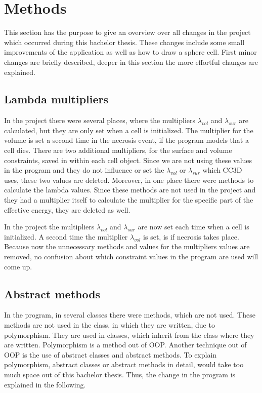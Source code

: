 \chapter{Methods}
    
This section has the purpose to give an overview over all changes in the project which occurred during this bachelor thesis. These changes include some small improvements of the application as well as how to draw a sphere cell. First minor changes are briefly described, deeper in this section the more effortful changes are explained. 

\section{Lambda multipliers} \label{sec:LambdaMultipliers}
In the project there were several places, where the multipliers $\lambda_{vol}$ and $\lambda_{sur}$ are calculated, but they are only set when a cell is initialized. The multiplier for the volume is set a second time in the necrosis event, if the program models that a cell dies. \newline
There are two additional multipliers, for the surface and volume constraints, saved in within each cell object. Since we are not using these values in the program and they do not influence or set the $\lambda_{vol}$ or $\lambda_{sur}$ which \ac{CC3D} uses, these two values are deleted. Moreover, in one place there were methods to calculate the lambda values. Since these methods are not used in the project and they had a multiplier itself to calculate the multiplier for the specific part of the effective energy, they are deleted as well. 

In the project the multipliers $\lambda_{vol}$ and $\lambda_{sur}$ are now set each time when a cell is initialized. A second time the multiplier $\lambda_{vol}$ is set, is if necrosis takes place. Because now the unnecessary methods and values for the multipliers values are removed, no confusion about which constraint values in the program are used will come up.

\section{Abstract methods}\label{sec:AbstractMethods}
In the program, in several classes there were methods, which are not used. These methods are not used in the class, in which they are written, due to polymorphism. They are used in classes, which inherit from the class where they are written. Polymorphism is a method out of \ac{OOP}. Another technique out of \ac{OOP} is the use of abstract classes and abstract methods. To explain polymorphism, abstract classes or abstract methods in detail, would take too much space out of this bachelor thesis. Thus, the change in the program is explained in the following.

